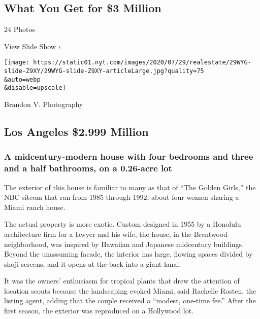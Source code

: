 \href{https://www.nytimes.com/slideshow/2020/07/29/realestate/what-you-get-for-3-million.html}{}

\hypertarget{what-you-get-for-3-million}{%
\subsection{What You Get for \$3
Million}\label{what-you-get-for-3-million}}

24 Photos

View Slide Show ›

\texttt{[image: https://static01.nyt.com/images/2020/07/29/realestate/29WYG-slide-Z9XY/29WYG-slide-Z9XY-articleLarge.jpg?quality=75\\\&auto=webp\\\&disable=upscale]}

Brandon V. Photography

\hypertarget{los-angeles--2999-million}{%
\subsection{Los Angeles \textbar{} \$2.999
Million}\label{los-angeles--2999-million}}

\hypertarget{a-midcentury-modern-house-with-four-bedrooms-and-three-and-a-half-bathrooms-on-a-026-acre-lot}{%
\subsubsection{\texorpdfstring{\textbf{A midcentury-modern house with
four bedrooms and three and a half bathrooms, on a 0.26-acre
lot}}{A midcentury-modern house with four bedrooms and three and a half bathrooms, on a 0.26-acre lot}}\label{a-midcentury-modern-house-with-four-bedrooms-and-three-and-a-half-bathrooms-on-a-026-acre-lot}}

The exterior of this house is familiar to many as that of ``The Golden
Girls,'' the NBC sitcom that ran from 1985 through 1992, about four
women sharing a Miami ranch house.

The actual property is more exotic. Custom designed in 1955 by a
Honolulu architecture firm for a lawyer and his wife, the house, in the
Brentwood neighborhood, was inspired by Hawaiian and Japanese midcentury
buildings. Beyond the unassuming facade, the interior has large, flowing
spaces divided by shoji screens, and it opens at the back into a giant
lanai.

It was the owners' enthusiasm for tropical plants that drew the
attention of location scouts because the landscaping evoked Miami, said
Rachelle Rosten, the listing agent, adding that the couple received a
``modest, one-time fee.'' After the first season, the exterior was
reproduced on a Hollywood lot.

